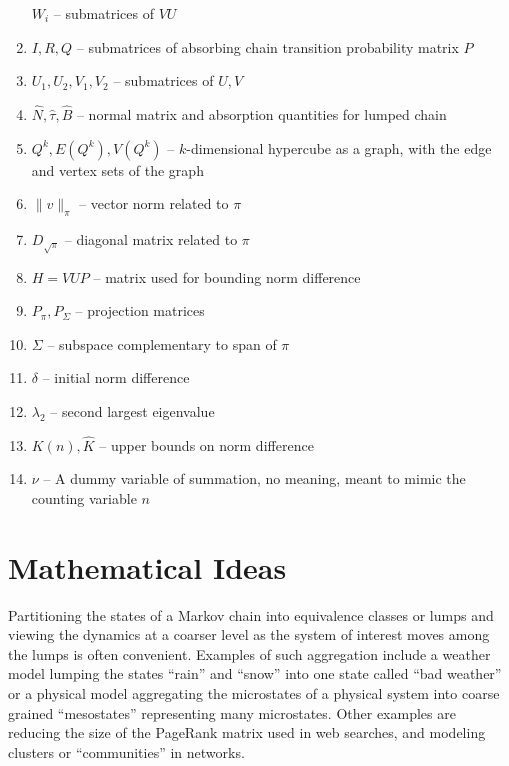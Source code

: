 \documentclass[12pt]{article}
\begin{document}
\begin{enumerate}
        \( W_i \) -- submatrices of \( VU \)
    \item
        \( I, R, Q \) -- submatrices of absorbing chain transition
        probability matrix \( P \)
    \item
        \( U_1, U_2, V_1, V_2 \) -- submatrices of \( U, V \)
    \item
        \( \hat{N}, \hat{\tau}, \hat{B} \) -- normal matrix and
        absorption quantities for lumped chain
    \item
        \( Q^k, E(Q^k), V(Q^k) \) -- \( k \)-dimensional hypercube as a
        graph, with the edge and vertex sets of the graph
    \item
        \( \| v \|_{\pi} \) -- vector norm related to \( \pi \)
    \item
        \( D_{\sqrt{\pi}} \) -- diagonal matrix related to \( \pi \)
    \item
        \( H = VUP \) -- matrix used for bounding norm difference
    \item
        \( P_{\pi}, P_{\Sigma} \) -- projection matrices
    \item
        \( \Sigma \) -- subspace complementary to span of \( \pi \)
    \item
        \( \delta \) -- initial norm difference
    \item
        \( \lambda_2 \) -- second largest eigenvalue
    \item
        \( K(n), \hat{K} \) -- upper bounds on norm difference
    \item
        \( \nu \) -- A dummy variable of summation, no meaning, meant to
        mimic the counting variable \( n \)
\end{enumerate}

\hr

\section*{Mathematical Ideas}

Partitioning the states of a Markov chain into equivalence classes or
lumps and viewing the dynamics at a coarser level as the system of
interest moves among the lumps is often convenient.  Examples of such
aggregation include a weather model lumping the states ``rain'' and
``snow'' into one state called ``bad weather'' or a physical model
aggregating the microstates of a physical system into coarse grained
``mesostates'' representing many microstates.  Other examples are
reducing the size of the PageRank matrix used in web searches, and
modeling clusters or ``communities'' in networks.
\end{document}
